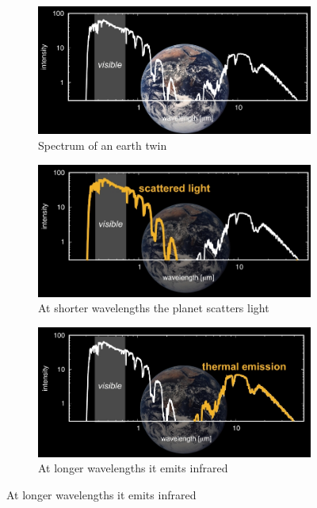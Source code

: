 \documentclass[]{article}
\begin{document}
\begin{figure}[H]
	\caption{Spectrum of an earth twin}
	\begin{subfigure}[b]{0.45\textwidth}
		\caption{Spectrum of an earth twin}\label{fig:spectrum:earth:twin}
		\includegraphics[width=\textwidth]{SpectrumEarthTwin}
	\end{subfigure}
	\begin{subfigure}[b]{0.45\textwidth}
		\caption{At shorter wavelengths the planet scatters light}\label{fig:spectrum:earth:twin1}
		\includegraphics[width=\textwidth]{SpectrumEarthTwin1}
	\end{subfigure}
	\begin{subfigure}[b]{0.45\textwidth}
		\caption{At longer wavelengths it emits infrared}\label{fig:spectrum:earth:twin2}
		\includegraphics[width=\textwidth]{SpectrumEarthTwin2}

\end{subfigure}
\end{figure}
\end{document}
